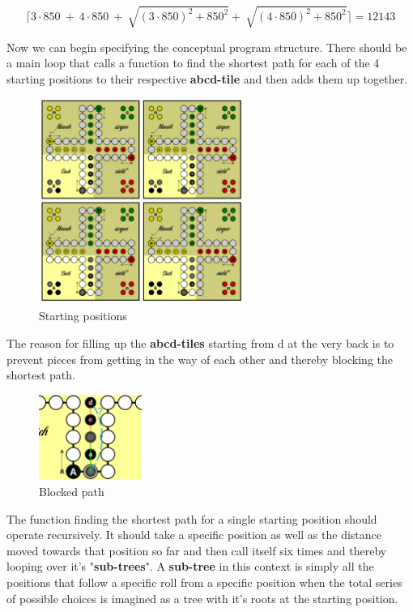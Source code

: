 \documentclass[12pt]{article}
\begin{document}
\[
	\lceil 3\cdot850\ +\ 4\cdot850\ +\ \sqrt{\left(3\cdot850\right)^{2}+850^{2}}+\ \sqrt{\left(4\cdot850\right)^{2}+850^{2}}\rceil = 12143
\]

\newpage

Now we can begin specifying the conceptual program structure.
There should be a main loop that calls a function to find the shortest path for each of the 4 starting positions to their respective \textbf{abcd-tile} and then adds them up together.

\begin{figure}[htbp]
    \centering
    \includegraphics[width=0.6\textwidth]{images/Figure3}
    \caption{Starting positions}
    \label{fig:startpos}
\end{figure}

The reason for filling up the \textbf{abcd-tiles} starting from d at the very back is to prevent pieces from getting in the way of each other and thereby blocking the shortest path.

\begin{figure}[htbp]
    \centering
    \includegraphics[width=0.3\textwidth]{images/Figure4}
    \caption{Blocked path}
    \label{fig:blockedpath}
\end{figure}

\newpage

The function finding the shortest path for a single starting position should operate recursively. It should take a specific position as well as the distance moved towards that position so far and then call itself six times and thereby looping over it's "\textbf{sub-trees}".
A \textbf{sub-tree} in this context is simply all the positions that follow a specific roll from a specific position when the total series of possible choices is imagined as a tree with it's roots at the starting position.
\end{document}
